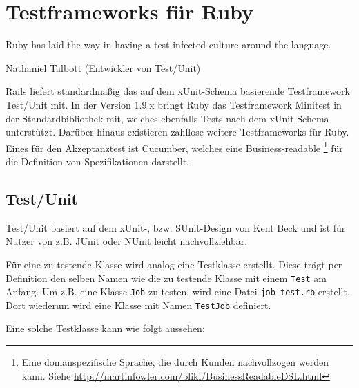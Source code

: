 \section{Testframeworks für Ruby}
\epigraph{Ruby has laid the way in having a test-infected culture around the language.}{Nathaniel Talbott (Entwickler von Test/Unit)}

Rails liefert standardmäßig das auf dem xUnit-Schema basierende Testframework Test/Unit mit. In der Version 1.9.x bringt Ruby das Testframework Minitest in der Standardbibliothek mit, welches ebenfalls Tests nach dem xUnit-Schema unterstützt. Darüber hinaus existieren zahllose weitere Testframeworks für Ruby. Eines für den Akzeptanztest ist Cucumber, welches eine Business-readable \footnote{Eine domänspezifische Sprache, die durch Kunden nachvollzogen werden kann. Siehe \url{http://martinfowler.com/bliki/BusinessReadableDSL.html}} für die Definition von Spezifikationen darstellt.
\subsection{Test/Unit}
\label{sec:rubyTestUnit}
Test/Unit basiert auf dem xUnit-, bzw. SUnit-Design von Kent Beck und ist für Nutzer von z.B. JUnit oder NUnit leicht nachvollziehbar.

Für eine zu testende Klasse wird analog eine Testklasse erstellt. Diese trägt per Definition den selben Namen wie die zu testende Klasse mit einem \texttt{Test} am Anfang. Um z.B. eine Klasse \texttt{Job} zu testen, wird eine Datei \texttt{job\_test.rb}  erstellt. Dort wiederum wird eine Klasse mit Namen \texttt{TestJob} definiert.


Eine solche Testklasse kann wie folgt aussehen:
\begin{ruby}[label=Testen mit Test/Unit]
 

   
   
      

   

   
       

       
\end{ruby}

